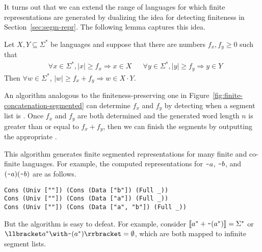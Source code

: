It turns out that we can extend the range of languages for which
finite representations are generated by dualizing the idea for
detecting finiteness in Section~\ref{sec:segm-repr}. The following
lemma captures this idea.
\begin{lemma}
Let $X, Y \subseteq \Sigma^*$ be languages and 
suppose that there are numbers $f_x, f_y\ge0$ such that
\begin{align*}
  & \forall x \in \Sigma^*,  |x| \ge f_x \Rightarrow x \in X
  && \forall y \in \Sigma^*, |y| \ge f_y \Rightarrow y \in Y
\end{align*}
Then $\forall w \in \Sigma^*$, $|w|\ge f_x+f_y \Rightarrow w \in X\cdot Y$.
\end{lemma}
 An algorithm analogous 
to the finiteness-preserving one in
Figure~\ref{fig:finite-concatenation-segmented} can determine $f_x$
and $f_y$ by detecting when a segment list is . Once $f_x$
and $f_y$ are both determined and the generated word length $n$ is
greater than or equal to $f_x+f_y$, then we can finish the segments by
outputting the appropriate .

This algorithm generates finite segmented representations
for many finite and co-finite languages. For example, the computed
representations for $\texttt{\textasciitilde} a$, $\texttt{\textasciitilde} b$, and
${(\texttt{\textasciitilde}{a})(\texttt{\textasciitilde}{b})}$ are as follows. 
\begin{lstlisting}[numbers=none]
Cons (Univ [""]) (Cons (Data ["b"]) (Full _))
Cons (Univ [""]) (Cons (Data ["a"]) (Full _))
Cons (Univ [""]) (Cons (Data ["a", "b"]) (Full _))
\end{lstlisting}
But the algorithm is easy to defeat. For example, consider
$\llbracket a^* + \texttt{\textasciitilde}{(a^*)}\rrbracket = \Sigma^*$ or
$\Lang{\Rintersect{\Rstar a} \Rcomplement{(\Rstar a)}} = \emptyset$,
which are both mapped to infinite segment lists.

\clearpage{}

